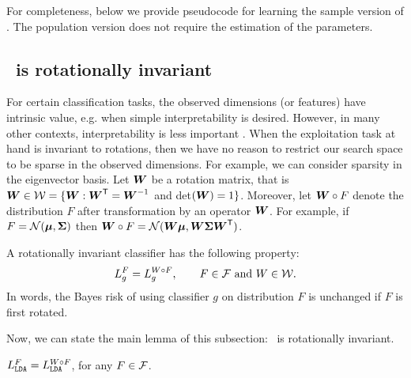 \documentclass[11pt]{extarticle}
\begin{document}
For completeness, below we provide pseudocode for learning the sample version of \Lol. The population version does not require the estimation of the parameters.





\subsection{\Lda~is rotationally invariant}
\label{app:rot}

For certain classification tasks, the observed dimensions (or features) have intrinsic value, e.g. when simple interpretability is desired.  However, in many other contexts, interpretability is less important \cite{Breiman2001b}.  When the exploitation task at hand is invariant to rotations, then we have no reason to restrict our search space to be sparse in the observed dimensions. For example, we can consider sparsity in the eigenvector basis.
Let  $\boldsymbol{W}$ be a rotation matrix, that is $\boldsymbol{W} \in \mathcal{W}=\{\boldsymbol{W} : \boldsymbol{W}^{\mathsf{T}} = \boldsymbol{W}^{-1}$ and det$(\boldsymbol{W})=1\}$.
Moreover, let $\boldsymbol{W} \circ F$ denote the distribution $F$ after transformation by an operator $\boldsymbol{W}$.  For example, if $F=\mathcal{N}(\boldsymbol{\mu},\boldsymbol{\Sigma})$ then $\boldsymbol{W} \circ F=\mathcal{N}(\boldsymbol{W}  \boldsymbol{\mu}, \boldsymbol{W} \boldsymbol{\Sigma} \boldsymbol{W}^{\mathsf{T}})$.

\begin{defi}
A rotationally invariant classifier has the following property:
$$L_g^F = L_g^{W \circ F}, \qquad F \in \mathcal{F} \text{ and } W \in \mathcal{W}.$$
In words, the Bayes risk of using classifier $g$ on distribution $F$ is unchanged if $F$ is first rotated. %
\end{defi}


Now, we can state the main lemma of this subsection:  \Lda~is rotationally invariant.
\begin{lem} \label{l:rot}
$L_{{\texttt{LDA}}}^F = L_{{\texttt{LDA}}}^{W \circ F}$, for any $F \in \mathcal{F}$.
\end{lem}
\end{document}
